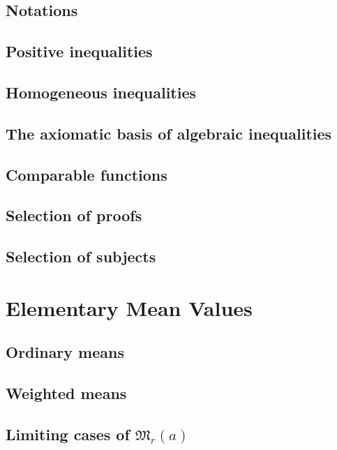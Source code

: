 \documentclass[oneside]{book}
\numberwithin{equation}{section}
\begin{document}
\subsection{Notations}

\subsection{Positive inequalities}

\subsection{Homogeneous inequalities}

\subsection{The axiomatic basis of algebraic inequalities}

\subsection{Comparable functions}

\subsection{Selection of proofs}

\subsection{Selection of subjects}


\section{Elementary Mean Values}

\subsection{Ordinary means}

\subsection{Weighted means}

\subsection{Limiting cases of $\mathfrak{M}_r(a)$}
\end{document}
